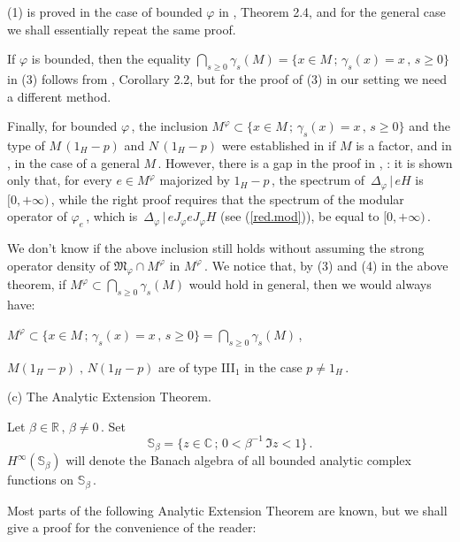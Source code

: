 \documentclass[reqno]{amsart}
\theoremstyle{definition}
\theoremstyle{remark}
\numberwithin{equation}{section}
\theoremstyle{plain}
\begin{document}
 (1) is proved in the case of bounded
$\varphi$ in \cite{Bo5}, Theorem 2.4, and for the general case we
shall essentially repeat the same proof.

If $\varphi$ is bounded, then the equality $\displaystyle
\bigcap\limits_{s\geq 0}\gamma_s (M) = \{ x\in M\, ;\,\gamma_s (x)
= x\, ,\, s\geq 0\}$ in (3) follows from \cite{Lo1}, Corollary 2.2,
but for the proof of (3) in our setting we need a different method.

Finally, for bounded $\varphi\,$, the inclusion
$M^\varphi\subset\{ x\in M\, ;\,\gamma_s (x)=x\, ,\, s\geq 0\}$
and the type of $M\, (1_H -p)$ and $N\, (1_H -p)$ were established
in \cite{Wie1} if $M$ is a factor, and in \cite{Bo4}, \cite{Bo5}
in the case of a general $M\,$. However, there is a gap in the
proof in \cite{Bo4}, \cite{Bo5}: it is shown only that, for every
$e\in M^\varphi$ majorized by $1_H -p\,$, the spectrum of
$\,\Delta_\varphi\, |\, e H$ is $[0,+\infty)\,$, while the right
proof requires that the spectrum of the modular operator of
$\varphi_e\,$, which is $\,\Delta_\varphi\, |\, eJ_\varphi
eJ_\varphi H$ (see (\ref{red.mod})), be equal to $[0,+\infty)\,$.

We don't know if the above inclusion still holds without assuming
the strong operator density of
$\mathfrak M_\varphi\cap M^\varphi$ in $M^\varphi\,$.
We notice that, by (3) and (4) in the above theorem, if
$\displaystyle M^\varphi\subset\bigcap\limits_{s\geq 0}\gamma_s (M)$
would hold in general, then we would always have:
\smallskip

\noindent\hspace{2.65 cm}$\displaystyle M^\varphi\subset \big\{ x
\in M\, ;\,\gamma_s (x) =x\, ,\, s\geq 0\big\} =
\bigcap\limits_{s\geq 0}\gamma_s (M)\,$,
\smallskip

\noindent\hspace{2.1 cm}$M (1_H-p)\; ,\, N (1_H-p)$ are of type
III$_1$ in the case $p\neq 1_H\,$.
\smallskip

\bigskip
\noindent (c) {\sc The Analytic Extension Theorem}.
\bigskip

Let $\beta\in\mathbb R\, ,\,\beta\neq 0\,$. Set
\begin{equation*}
\mathbb S_\beta =\{ z\in\mathbb C\, ;\, 0<\beta^{-1}\,\Im z <1\}\, .
\end{equation*}
$H^\infty (\mathbb S_\beta )$ will denote the Banach algebra
of all bounded analytic complex functions on $\mathbb S_\beta\,$.

Most parts of the following Analytic Extension Theorem are known, but
we shall give a proof for the convenience of the reader:
\smallskip
\end{document}
